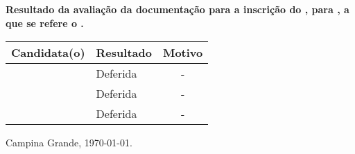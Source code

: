 \documentclass[12pt]{uaefata}
\date{} %
\begin{document}
\begin{letter}{
		\textbf{Resultado da avaliação da documentação para a  inscrição do \concurso, para \cargo,  a que se refere o \edital.}
	}

\opening{}

\centering

\begin{tabular}{|l|l|c|}
	\hline
	\textbf{Candidata(o)} & \textbf{Resultado} & \textbf{Motivo}\\
	\hline
	\cdta & Deferida &  - \\
	\cdtb & Deferida &  - \\
	\cdtc & Deferida &  - \\
	\hline
\end{tabular} 



\closing{Campina Grande, \today.}




\end{letter}
\end{document}
